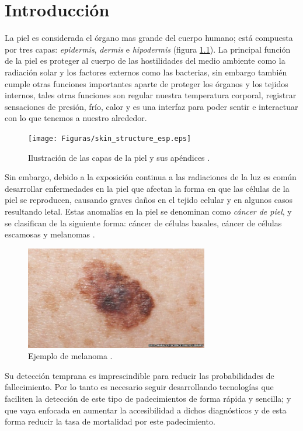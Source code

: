 
\chapter{Introducción}

La piel es considerada el órgano mas grande del cuerpo humano; está compuesta por tres capas: \emph{\gls{epidermis}}, \emph{\gls{dermis}} e \emph{\gls{hipodermis}} (figura \ref{fig:skin1_jpg}). La principal función de la piel es proteger al cuerpo de las hostilidades del medio ambiente como la radiación solar y los factores externos como las bacterias, sin embargo también cumple otras funciones importantes aparte de proteger los órganos y los tejidos internos, tales otras funciones son regular nuestra temperatura corporal, registrar sensaciones de presión, frío, calor y es una interfaz para poder sentir e interactuar con lo que tenemos a nuestro alrededor.

\begin{figure}[h!]
    \texttt{[image: Figuras/skin\_structure\_esp.eps]}
    \centering
    \caption{Ilustración de las capas de la piel y sus apéndices \citep{skin_1}.}
    \label{fig:skin1_jpg}
\end{figure}

Sin embargo, debido a la exposición continua a las radiaciones de la luz es común desarrollar enfermedades en la piel que afectan la forma en que las células de la piel se reproducen, causando graves daños en el tejido celular y en algunos casos resultando letal. Estas anomalías en la piel se denominan como \emph{cáncer de piel}, y se clasifican de la siguiente forma: cáncer de células basales, cáncer de células escamosas y melanomas \citep{cancer_org}.

\begin{figure}[h!]
    \includegraphics[width=80mm]{Figuras/skin_cancer_bbc.jpg}
    \centering
    \caption{Ejemplo de melanoma \citep{cancer_img_1}.}
    \label{fig:can_jpg}
\end{figure}

 Su detección temprana es imprescindible para reducir las probabilidades de fallecimiento. Por lo tanto es necesario seguir desarrollando tecnologías que faciliten la detección de este tipo de padecimientos de forma rápida y sencilla; y que vaya enfocada en aumentar la accesibilidad a dichos diagnósticos y de esta forma reducir la tasa de mortalidad por este padecimiento.

